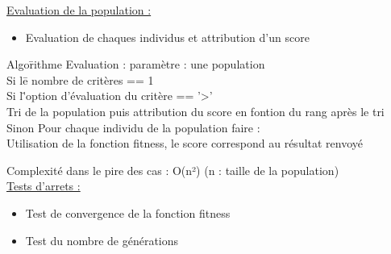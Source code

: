 \documentclass[a4paper,11pt]{article}
\begin{document}
		\underline{Evaluation de la population : }
		\begin{itemize}
			\item Evaluation de chaques individus et attribution d'un score
		\end{itemize}
		\begin{tabbing} 
		Algo\=rithme Evaluation : paramètre : une population\\
			\>Si l\=e nombre de critères == 1\\
			\>	\>Si l\='option d'évaluation du critère == '>'\\
			\>	\>	\>Tri de la population puis attribution du score en fontion du rang après le tri\\
			\>Sinon
			\>	\>Pour chaque individu de la population faire :\\
			\>	\>	\>Utilisation de la fonction fitness, le score correspond au résultat renvoyé
		\end{tabbing}
		Complexité dans le pire des cas : O(n²) (n : taille de la population)\\
		
		\underline{Tests d'arrets : }
		\begin{itemize}
			\item Test de convergence de la fonction fitness
			\item Test du nombre de générations\\
		\end{itemize}
\end{document}
